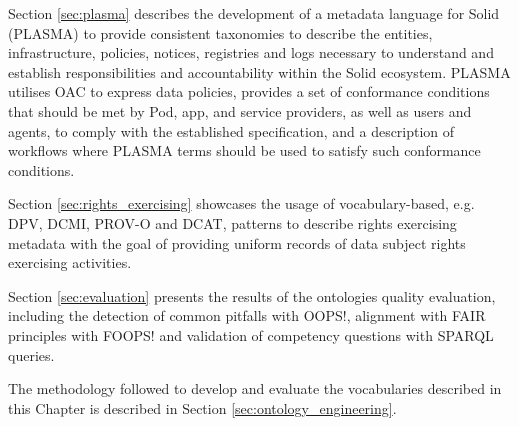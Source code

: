 Section \ref{sec:plasma} describes the development of a metadata language for Solid (PLASMA) to provide consistent taxonomies to describe the entities, infrastructure, policies, notices, registries and logs necessary to understand and establish responsibilities and accountability within the Solid ecosystem.
PLASMA utilises OAC to express data policies, provides a set of conformance conditions that should be met by Pod, app, and service providers, as well as users and agents, to comply with the established specification, and a description of workflows where PLASMA terms should be used to satisfy such conformance conditions.

Section \ref{sec:rights_exercising} showcases the usage of vocabulary-based, e.g. DPV, DCMI, PROV-O and DCAT, patterns to describe rights exercising metadata with the goal of providing uniform records of data subject rights exercising activities.

Section \ref{sec:evaluation} presents the results of the ontologies quality evaluation, including the detection of common pitfalls with OOPS!, alignment with FAIR principles with FOOPS! and validation of competency questions with SPARQL queries.

The methodology followed to develop and evaluate the vocabularies described in this Chapter is described in Section \ref{sec:ontology_engineering}.





